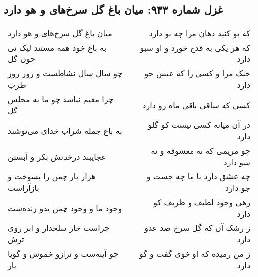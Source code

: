 \begin{center}
\section*{غزل شماره ۹۳۳: میان باغ گل سرخ‌های و هو دارد}
\label{sec:0933}
\begin{longtable}{l p{0.5cm} r}
میان باغ گل سرخ‌های و هو دارد
&&
که بو کنید دهان مرا چه بو دارد
\\
به باغ خود همه مستند لیک نی چون گل
&&
که هر یکی به قدح خورد و او سبو دارد
\\
چو سال سال نشاطست و روز روز طرب
&&
خنک مرا و کسی را که عیش خو دارد
\\
چرا مقیم نباشد چو ما به مجلس گل
&&
کسی که ساقی باقی ماه رو دارد
\\
به باغ جمله شراب خدای می‌نوشند
&&
در آن میانه کسی نیست کو گلو دارد
\\
عجایبند درختانش بکر و آبستن
&&
چو مریمی که نه معشوقه و نه شو دارد
\\
هزار بار چمن را بسوخت و بازآراست
&&
چه عشق دارد با ما چه جست و جو دارد
\\
وجود ما و وجود چمن بدو زنده‌ست
&&
زهی وجود لطیف و ظریف کو دارد
\\
چراست خار سلحدار و ابر روی ترش
&&
ز رشک آن که گل سرخ صد عدو دارد
\\
چو آینه‌ست و ترازو خموش و گویا یار
&&
ز من رمیده که او خوی گفت و گو دارد
\\
\end{longtable}
\end{center}
